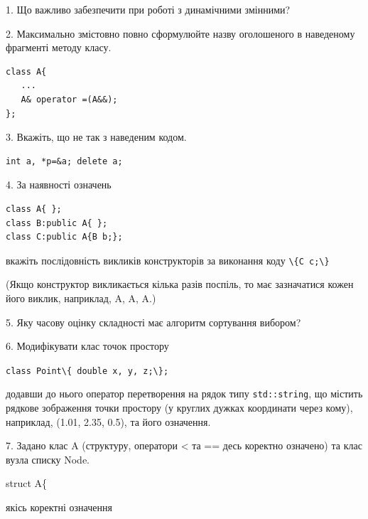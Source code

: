 \documentclass[12pt, ukrainian]{article}
\def\code#1{\Verb!#1!}
\begin{document}
{%
1. Що важливо забезпечити при роботі з динамічними змінними?%
\par
\vspace{2mm}
2. Максимально змістовно повно сформулюйте назву оголошеного в наведеному фрагменті методу класу.
\vspace{-3mm}
\begin{verbatim}class A{
   ...
   A& operator =(A&&);
};\end{verbatim}
\vspace{-3mm}
\par
\vspace{2mm}
3. Вкажіть, що не так з наведеним кодом.
\vspace{-3mm}
\begin{verbatim}int a, *p=&a; delete a;\end{verbatim}
\vspace{-3mm}
\par
\vspace{2mm}
4. За наявності означень
\vspace{-3mm}
\begin{verbatim}
class A{ };
class B:public A{ };
class C:public A{B b;};\end{verbatim}
\vspace{-3mm}
вкажіть послідовність викликів конструкторів за виконання коду \code{\{C c;\}} 

(Якщо конструктор викликається кілька разів поспіль, то має зазначатися кожен його виклик, наприклад, A, A, A.)

\vspace{2mm}
5. Яку часову оцінку складності має алгоритм сортування вибором?
\par
\vspace{2mm}
6. Модифікувати клас точок простору 

\qquad\code{class Point\{ double x, y, z;\};}


додавши до нього оператор перетворення на рядок типу \code{std::string}, що містить рядкове зображення точки простору (у круглих дужках координати через кому), наприклад, (1.01, 2.35, 0.5), та його означення.%
\par
\vspace{2mm}
7. 
Задано клас A (структуру, оператори < та == десь коректно означено) та клас вузла списку Node.

struct A\{

\quad  якісь коректні означення 

}
\end{document}
